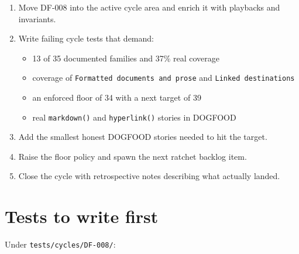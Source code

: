 \begin{enumerate}
\def\labelenumi{\arabic{enumi}.}
\tightlist
\item
  Move DF-008 into the active cycle area and enrich it with playbacks and invariants.
\item
  Write failing cycle tests that demand:

  \begin{itemize}
  \tightlist
  \item
    13 of 35 documented families and 37\% real coverage
  \item
    coverage of \texttt{F\allowbreak{}o\allowbreak{}r\allowbreak{}m\allowbreak{}a\allowbreak{}t\allowbreak{}t\allowbreak{}e\allowbreak{}d\allowbreak{} \allowbreak{}d\allowbreak{}o\allowbreak{}c\allowbreak{}u\allowbreak{}m\allowbreak{}e\allowbreak{}n\allowbreak{}t\allowbreak{}s\allowbreak{} \allowbreak{}a\allowbreak{}n\allowbreak{}d\allowbreak{} \allowbreak{}p\allowbreak{}r\allowbreak{}o\allowbreak{}s\allowbreak{}e} and \texttt{L\allowbreak{}i\allowbreak{}n\allowbreak{}k\allowbreak{}e\allowbreak{}d\allowbreak{} \allowbreak{}d\allowbreak{}e\allowbreak{}s\allowbreak{}t\allowbreak{}i\allowbreak{}n\allowbreak{}a\allowbreak{}t\allowbreak{}i\allowbreak{}o\allowbreak{}n\allowbreak{}s}
  \item
    an enforced floor of 34 with a next target of 39
  \item
    real \texttt{m\allowbreak{}a\allowbreak{}r\allowbreak{}k\allowbreak{}d\allowbreak{}o\allowbreak{}w\allowbreak{}n\allowbreak{}(\allowbreak{})} and \texttt{h\allowbreak{}y\allowbreak{}p\allowbreak{}e\allowbreak{}r\allowbreak{}l\allowbreak{}i\allowbreak{}n\allowbreak{}k\allowbreak{}(\allowbreak{})} stories in DOGFOOD
  \end{itemize}
\item
  Add the smallest honest DOGFOOD stories needed to hit the target.
\item
  Raise the floor policy and spawn the next ratchet backlog item.
\item
  Close the cycle with retrospective notes describing what actually landed.
\end{enumerate}

\section{Tests to write first}\label{record-070-tests-to-write-first}

Under \texttt{t\allowbreak{}e\allowbreak{}s\allowbreak{}t\allowbreak{}s\allowbreak{}/\allowbreak{}c\allowbreak{}y\allowbreak{}c\allowbreak{}l\allowbreak{}e\allowbreak{}s\allowbreak{}/\allowbreak{}D\allowbreak{}F\allowbreak{}-\allowbreak{}0\allowbreak{}0\allowbreak{}8\allowbreak{}/}:


